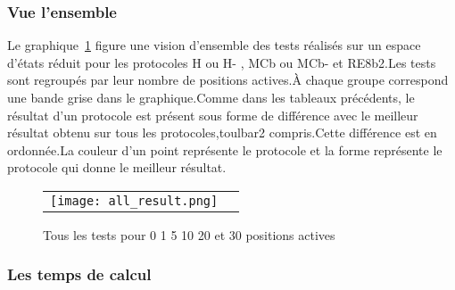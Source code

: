    \subsubsection{Vue l'ensemble}

Le graphique~\ref{graph:all_result} figure une vision d'ensemble des tests réalisés sur un espace d'états réduit pour les protocoles H ou H- , MCb ou MCb- et RE8b2.Les tests sont regroupés par leur nombre de positions actives.À chaque groupe correspond une bande grise dans le graphique.Comme dans les tableaux précédents, le résultat d'un protocole est présent sous forme de différence avec le meilleur résultat obtenu sur tous les protocoles,toulbar2 compris.Cette différence est en ordonnée.La couleur d'un point représente le protocole et la forme représente le protocole qui donne le meilleur résultat.


    \begin{figure}[h]
      \centering
      \begin{tabular}{cc}
        \texttt{[image: all\_result.png]} 
      \end{tabular}
      
      \caption{Tous les tests pour 0 1 5 10 20 et 30 positions actives}
\label{graph:all_result}
    \end{figure}


    \subsubsection{Les temps de calcul} 


